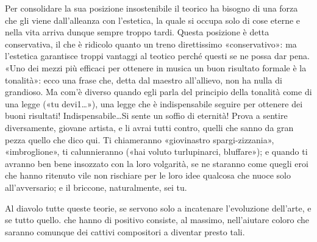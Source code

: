 \documentclass{../../lib/gs}
\begin{document}
Per consolidare la sua posizione insostenibile il teorico ha bisogno di una forza che gli viene dall'alleanza con l'estetica, la quale si occupa solo di cose eterne e nella vita arriva dunque sempre troppo tardi. Questa posizione è detta conservativa, il che è ridicolo quanto un treno direttissimo «conservativo»: ma l'estetica garantisce troppi vantaggi al teotico perché questi se ne possa dar pena. «Uno dei mezzi più efficaci per ottenere in musica un buon risultato formale è la tonalità»: ecco una frase che, detta dal maestro all'allievo, non ha nulla di grandioso. Ma com'è diverso quando egli parla del principio della tonalità come di una legge («tu devi1\ldots»), una legge che è indispensabile seguire per ottenere dei buoni risultati! Indispensabile\ldots Si sente un soffio di eternità! Prova a sentire diversamente, giovane artista, e li avrai tutti contro, quelli che sanno da gran pezza quello che dico qui. Ti chiameranno «giovinastro spargi-zizzania», «imbroglione», ti calunnieranno («hai voluto turlupinarci, bluffare»); e quando ti avranno ben bene insozzato con la loro volgarità, se ne staranno come quegli eroi che hanno ritenuto vile non rischiare per le loro idee qualcosa che nuoce solo all'avversario; e il briccone, naturalmente, sei tu.

Al diavolo tutte queste teorie, se servono solo a incatenare l'evoluzione dell'arte, e se tutto quello. che hanno di positivo consiste, al massimo, nell'aiutare coloro che saranno comunque dei cattivi compositori a diventar presto tali.
\end{document}
